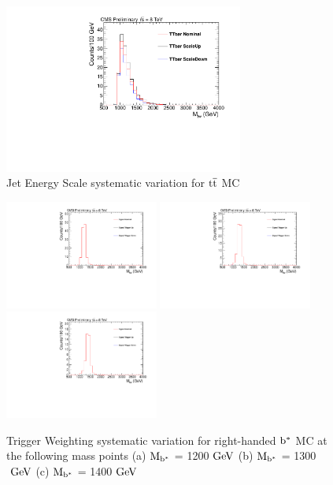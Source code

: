 \begin{figure}[htcb]
\begin{center}
\includegraphics[width=0.7\textwidth]{AN-14-049/figs/TTbar_PtScaling}
\caption{Jet Energy Scale systematic variation for $\mathrm{t\overline{t}}$ MC}
\label{figs:bsttbarJES}
\end{center}
\end{figure}

\begin{figure}[htcb]
\begin{center}
\includegraphics[width=0.45\textwidth]{AN-14-049/figs/Signal_M1200_TriggerWeighting}
\includegraphics[width=0.45\textwidth]{AN-14-049/figs/Signal_M1300_TriggerWeighting}
\includegraphics[width=0.45\textwidth]{AN-14-049/figs/Signal_M1400_TriggerWeighting}
\caption{
Trigger Weighting systematic variation for right-handed $\mathrm{b}^{*}$  MC at the following mass points
(a) $\mathrm{M_{\mathrm{b}^{*}}}$ = 1200$~\mathrm{GeV}$ 
(b) $\mathrm{M_{\mathrm{b}^{*}}}$ = 1300$~\mathrm{GeV}$
(c) $\mathrm{M_{\mathrm{b}^{*}}}$ = 1400$~\mathrm{GeV}$ 
}
\label{figs:bssignaltrig}
\end{center}
\end{figure}


